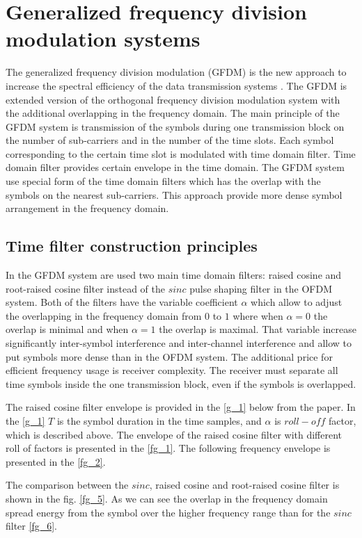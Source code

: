 \section{Generalized frequency division modulation systems}\label{sec:GFDM}
The generalized frequency division modulation (GFDM) is the new approach to increase the spectral efficiency of the data transmission systems\cite{Book25} \cite{Book22}. The GFDM is extended version of the orthogonal frequency division modulation system with the additional overlapping in the frequency domain. The main principle of the GFDM system is transmission of the symbols during one transmission block on the number of sub-carriers and in the number of the time slots. Each symbol corresponding to the certain time slot is modulated with time domain filter. Time domain filter provides certain envelope in the time domain. The GFDM system use special form of the time domain filters which has the overlap with the symbols on the nearest sub-carriers. This approach provide more dense symbol arrangement in the frequency domain\cite{Book24}.
\subsection{Time filter construction principles}\label{part:TFCP}
 In the GFDM system are used two main time domain filters: raised cosine and root-raised cosine filter instead of the $sinc$ pulse shaping filter in the OFDM system.  Both of the filters have the variable coefficient $\alpha$ which allow to adjust the overlapping in the frequency domain from $0$ to $1$ where when $\alpha=0$ the overlap is minimal and  when $\alpha=1$ the overlap is maximal\cite{Book30}\cite{Book21}. That variable increase significantly inter-symbol interference and inter-channel interference and allow to put symbols more dense than in the OFDM system. The additional price for efficient frequency usage is receiver complexity. The receiver must separate all time symbols inside the one transmission block, even if the symbols is overlapped. 
 
 The raised cosine filter envelope is provided in the \eqref{g_1} below from the \cite{Book5} paper. In the \eqref{g_1} $T$ is the symbol duration in the time samples, and $\alpha$ is $roll-off$ factor, which is described above\cite{Book33}. The envelope of the raised cosine filter with different roll of factors is presented in the \ref{fg_1}. The following frequency envelope is presented in the \ref{fg_2}.

The comparison between the  $sinc$, raised cosine and root-raised cosine filter is shown in the fig. \ref{fg_5}. As we can see the overlap in the frequency domain spread energy from the symbol over the higher frequency range than for the $sinc$ filter \ref{fg_6}.

